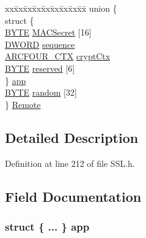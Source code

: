 \begin{DoxyCompactItemize}
\begin{tabbing}
\end{tabbing}\item 
\begin{tabbing}
xx\=xx\=xx\=xx\=xx\=xx\=xx\=xx\=xx\=\kill
union \{\\
\>struct \{\\
\>\>\hyperlink{_generic_type_defs_8h_a4ae1dab0fb4b072a66584546209e7d58}{BYTE} \hyperlink{struct_s_s_l___k_e_y_s_abd95c8c720222aa5d74ba6f168a97da8}{MACSecret} \mbox{[}16\mbox{]}\\
\>\>\hyperlink{_generic_type_defs_8h_ad342ac907eb044443153a22f964bf0af}{DWORD} \hyperlink{struct_s_s_l___k_e_y_s_a8ae5d5027313c26248c36c3dcf205b55}{sequence}\\
\>\>\hyperlink{struct_a_r_c_f_o_u_r___c_t_x}{ARCFOUR\_CTX} \hyperlink{struct_s_s_l___k_e_y_s_a53bb0f6c9dc4a5310b452fc7ee4dac5d}{cryptCtx}\\
\>\>\hyperlink{_generic_type_defs_8h_a4ae1dab0fb4b072a66584546209e7d58}{BYTE} \hyperlink{struct_s_s_l___k_e_y_s_a978913f88617d12113203d8129ab02a1}{reserved} \mbox{[}6\mbox{]}\\
\>\} \hyperlink{struct_s_s_l___k_e_y_s_adcca47eb1338eaab3aa12d2a9dd9daa4}{app}\\
\>\hyperlink{_generic_type_defs_8h_a4ae1dab0fb4b072a66584546209e7d58}{BYTE} \hyperlink{struct_s_s_l___k_e_y_s_ac4c550fd4b12f7b4f441146c3eaa8835}{random} \mbox{[}32\mbox{]}\\
\} \hyperlink{struct_s_s_l___k_e_y_s_ac5c4b1f50a5eb4f54b15aba0d9add2de}{Remote}\\

\end{tabbing}\end{DoxyCompactItemize}


\subsection{Detailed Description}


Definition at line 212 of file S\+S\+L.\+h.



\subsection{Field Documentation}
\hypertarget{struct_s_s_l___k_e_y_s_ab360e788c87e0e6a0bb776e23aa82b2e}{}
\subsubsection[{app}]{\setlength{\rightskip}{0pt plus 5cm}struct \{ ... \}  app}\label{struct_s_s_l___k_e_y_s_ab360e788c87e0e6a0bb776e23aa82b2e}
\hypertarget{struct_s_s_l___k_e_y_s_adcca47eb1338eaab3aa12d2a9dd9daa4}{}
